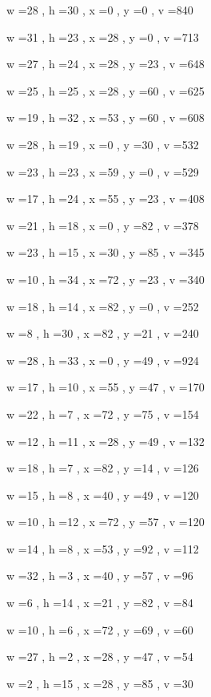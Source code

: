 \documentclass[11pt]{article}
\begin{document}
w =28 , h =30 , x =0 , y =0 , v =840
\par
w =31 , h =23 , x =28 , y =0 , v =713
\par
w =27 , h =24 , x =28 , y =23 , v =648
\par
w =25 , h =25 , x =28 , y =60 , v =625
\par
w =19 , h =32 , x =53 , y =60 , v =608
\par
w =28 , h =19 , x =0 , y =30 , v =532
\par
w =23 , h =23 , x =59 , y =0 , v =529
\par
w =17 , h =24 , x =55 , y =23 , v =408
\par
w =21 , h =18 , x =0 , y =82 , v =378
\par
w =23 , h =15 , x =30 , y =85 , v =345
\par
w =10 , h =34 , x =72 , y =23 , v =340
\par
w =18 , h =14 , x =82 , y =0 , v =252
\par
w =8 , h =30 , x =82 , y =21 , v =240
\par
w =28 , h =33 , x =0 , y =49 , v =924
\par
w =17 , h =10 , x =55 , y =47 , v =170
\par
w =22 , h =7 , x =72 , y =75 , v =154
\par
w =12 , h =11 , x =28 , y =49 , v =132
\par
w =18 , h =7 , x =82 , y =14 , v =126
\par
w =15 , h =8 , x =40 , y =49 , v =120
\par
w =10 , h =12 , x =72 , y =57 , v =120
\par
w =14 , h =8 , x =53 , y =92 , v =112
\par
w =32 , h =3 , x =40 , y =57 , v =96
\par
w =6 , h =14 , x =21 , y =82 , v =84
\par
w =10 , h =6 , x =72 , y =69 , v =60
\par
w =27 , h =2 , x =28 , y =47 , v =54
\par
w =2 , h =15 , x =28 , y =85 , v =30
\par
\newpage
\end{document}
